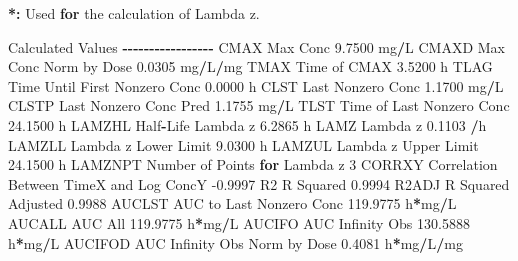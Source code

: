 \documentclass[
  12pt,
]{krantz}
\newenvironment{Shaded}{\begin{snugshade}}{\end{snugshade}}
\newcommand{\ControlFlowTok}[1]{\textcolor[rgb]{0.13,0.29,0.53}{\textbf{#1}}}
\newcommand{\DecValTok}[1]{\textcolor[rgb]{0.00,0.00,0.81}{#1}}
\newcommand{\ErrorTok}[1]{\textcolor[rgb]{0.64,0.00,0.00}{\textbf{#1}}}
\newcommand{\FloatTok}[1]{\textcolor[rgb]{0.00,0.00,0.81}{#1}}
\newcommand{\NormalTok}[1]{#1}
\newcommand{\OperatorTok}[1]{\textcolor[rgb]{0.81,0.36,0.00}{\textbf{#1}}}
\newcommand{\StringTok}[1]{\textcolor[rgb]{0.31,0.60,0.02}{#1}}
\begin{document}
\begin{Shaded}
\begin{Highlighting}[]
\OperatorTok{*}\ErrorTok{:}\StringTok{ }\NormalTok{Used }\ControlFlowTok{for}\NormalTok{ the calculation of Lambda z.}


\NormalTok{Calculated Values}
\OperatorTok{{-}{-}{-}{-}{-}{-}{-}{-}{-}{-}{-}{-}{-}{-}{-}{-}{-}}
\NormalTok{CMAX       Max Conc                                        }\FloatTok{9.7500}\NormalTok{ mg}\OperatorTok{/}\NormalTok{L}
\NormalTok{CMAXD      Max Conc Norm by Dose                           }\FloatTok{0.0305}\NormalTok{ mg}\OperatorTok{/}\NormalTok{L}\OperatorTok{/}\NormalTok{mg}
\NormalTok{TMAX       Time of CMAX                                    }\FloatTok{3.5200}\NormalTok{ h}
\NormalTok{TLAG       Time Until First Nonzero Conc                   }\FloatTok{0.0000}\NormalTok{ h}
\NormalTok{CLST       Last Nonzero Conc                               }\FloatTok{1.1700}\NormalTok{ mg}\OperatorTok{/}\NormalTok{L}
\NormalTok{CLSTP      Last Nonzero Conc Pred                          }\FloatTok{1.1755}\NormalTok{ mg}\OperatorTok{/}\NormalTok{L}
\NormalTok{TLST       Time of Last Nonzero Conc                      }\FloatTok{24.1500}\NormalTok{ h}
\NormalTok{LAMZHL     Half}\OperatorTok{{-}}\NormalTok{Life Lambda z                              }\FloatTok{6.2865}\NormalTok{ h}
\NormalTok{LAMZ       Lambda z                                        }\FloatTok{0.1103} \OperatorTok{/}\NormalTok{h}
\NormalTok{LAMZLL     Lambda z Lower Limit                            }\FloatTok{9.0300}\NormalTok{ h}
\NormalTok{LAMZUL     Lambda z Upper Limit                           }\FloatTok{24.1500}\NormalTok{ h}
\NormalTok{LAMZNPT    Number of Points }\ControlFlowTok{for}\NormalTok{ Lambda z                   }\DecValTok{3}
\NormalTok{CORRXY     Correlation Between TimeX and Log ConcY        }\FloatTok{{-}0.9997} 
\NormalTok{R2         R Squared                                       }\FloatTok{0.9994} 
\NormalTok{R2ADJ      R Squared Adjusted                              }\FloatTok{0.9988} 
\NormalTok{AUCLST     AUC to Last Nonzero Conc                      }\FloatTok{119.9775}\NormalTok{ h}\OperatorTok{*}\NormalTok{mg}\OperatorTok{/}\NormalTok{L}
\NormalTok{AUCALL     AUC All                                       }\FloatTok{119.9775}\NormalTok{ h}\OperatorTok{*}\NormalTok{mg}\OperatorTok{/}\NormalTok{L}
\NormalTok{AUCIFO     AUC Infinity Obs                              }\FloatTok{130.5888}\NormalTok{ h}\OperatorTok{*}\NormalTok{mg}\OperatorTok{/}\NormalTok{L}
\NormalTok{AUCIFOD    AUC Infinity Obs Norm by Dose                   }\FloatTok{0.4081}\NormalTok{ h}\OperatorTok{*}\NormalTok{mg}\OperatorTok{/}\NormalTok{L}\OperatorTok{/}\NormalTok{mg}

\end{Highlighting}
\end{Shaded}
\end{document}
